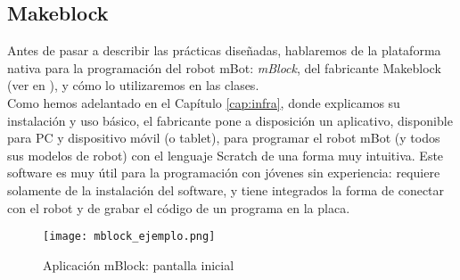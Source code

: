 \subsection{Makeblock}\label{subsec:makeblock}
Antes de pasar a describir las prácticas diseñadas, hablaremos de la plataforma nativa para la programación del robot mBot: \textit{mBlock}, del fabricante Makeblock (ver en \cite{makeblock}), y cómo lo utilizaremos en las clases. \\
Como hemos adelantado en el Capítulo \ref{cap:infra}, donde explicamos su instalación y uso básico, el fabricante pone a disposición un aplicativo, disponible para PC y dispositivo móvil (o tablet), para programar el robot mBot (y todos sus modelos de robot) con el lenguaje Scratch de una forma muy intuitiva. Este software es muy útil para la programación con jóvenes sin experiencia: requiere solamente de la instalación del software, y tiene integrados la forma de conectar con el robot y de grabar el código de un programa en la placa.\\
\begin{figure}[h]
	\centering
	\texttt{[image: mblock\_ejemplo.png]}
	\label{img:pantallamblock}
	\caption{Aplicación mBlock: pantalla inicial}
\end{figure}

